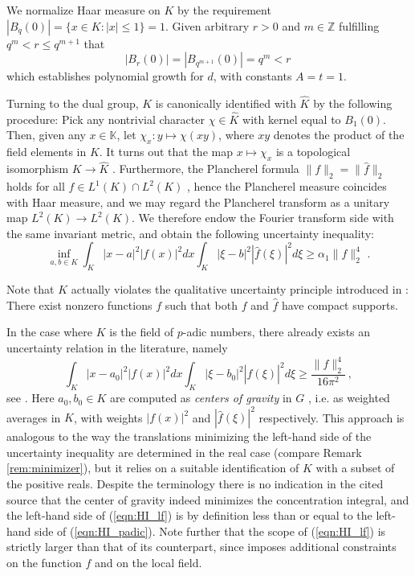 \documentclass[12pt, reqno]{amsart}
\begin{document}
We normalize Haar measure on $K$ by the requirement $|B_q(0)| = \{ x \in K : |x| \le 1 \} = 1$. Given arbitrary $r>0$ and $m \in \mathbb{Z}$ fulfilling $q^m < r \le q^{m+1}$ that 
\[ |B_r(0)|  = |B_{q^{m+1}}(0)| = q^m < r \,\] which establishes polynomial growth for $d$, with constants $A = t = 1$.

Turning to the dual group, $K$ is canonically identified with $\widehat{K}$ by the following procedure: Pick any nontrivial character $\chi \in \widehat{K}$ with kernel equal to $B_{1}(0)$. Then, given any $x \in \mathbb{K}$, let $\chi_x : y \mapsto \chi(x y)$, where $xy$ denotes the product of the field elements in $K$. It turns out that the map $x \mapsto \chi_x$ is a topological isomorphism $K \to \widehat{K}$ \cite[1.8]{taible}. Furthermore, the Plancherel formula $\| f \|_2 = \|\widehat{f}\|_2$ holds for all $f \in L^1(K) \cap L^2(K)$ \cite[II.2]{taible}, hence the Plancherel measure coincides with Haar measure, and we may regard the Plancherel transform as a unitary map $L^2(K) \to L^2(K)$. We therefore endow the Fourier transform side with the same invariant metric, and obtain the following uncertainty inequality: 
\begin{equation} \label{eqn:HI_lf}
\inf_{a,b \in K}
\int_{K} |x-a|^2 |f(x)|^2 dx \int_{K} |\xi-b|^2 |\widehat{f}(\xi)|^2 d\xi \ge 
\alpha_1 \| f \|_2^4\,\,.
\end{equation}

Note that $K$ actually violates the qualitative uncertainty principle introduced in \cite{MR1353372}: There exist nonzero functions $f$ such that both $f$ and $\widehat{f}$ have compact supports. 

In the case where $K$ is the field of $p$-adic numbers, there already exists an uncertainty relation in the literature, namely
\begin{equation} \label{eqn:HI_padic}
\int_{K} |x-a_0|^2 |f(x)|^2 dx \int_{K} |\xi-b_0|^2 |\widehat{f}(\xi)|^2 d\xi \ge 
\frac{\| f \|_2^4}{16 \pi^2}~,
\end{equation}
see \cite[Theorem 5.2]{MR2126447}. Here $a_0, b_0 \in K$ are computed as \textit{centers of gravity} in $G$ \cite[Definition 4.1]{MR2126447}, i.e. as weighted averages in $K$, with weights $|f(x)|^2$ and $|\widehat{f}(\xi)|^2$ respectively. This approach is analogous to the way the translations minimizing the left-hand side of the uncertainty inequality are determined in the real case (compare Remark \ref{rem:minimizer}), but it relies on a suitable identification of $K$ with a subset of the positive reals. Despite the terminology there is no indication in the cited source that the center of gravity indeed minimizes the concentration integral, and the left-hand side of (\ref{eqn:HI_lf}) is by definition less than or equal to the left-hand side of (\ref{eqn:HI_padic}). Note further that the scope of (\ref{eqn:HI_lf}) is strictly larger than that of its counterpart, since \cite[Theorem 5.2]{MR2126447} imposes additional constraints on the function $f$ and on the local field. %
\end{document}
